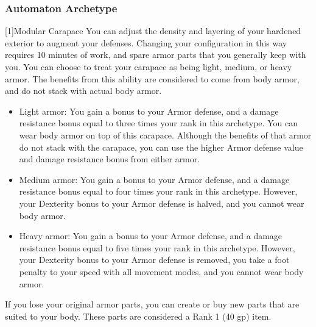         \subsubsection{Automaton Archetype}

            [1]{Modular Carapace} You can adjust the density and layering of your hardened exterior to augment your defenses.
            Changing your configuration in this way requires 10 minutes of work, and spare armor parts that you generally keep with you.
            You can choose to treat your carapace as being light, medium, or heavy armor.
            The benefits from this ability are considered to come from body armor, and do not stack with actual body armor.

            \begin{itemize}
                \item Light armor: You gain a  bonus to your Armor defense, and a damage resistance bonus equal to three times your rank in this archetype.
                    You can wear body armor on top of this carapace.
                    Although the benefits of that armor do not stack with the carapace, you can use the higher Armor defense value and damage resistance bonus from either armor.
                \item Medium armor: You gain a  bonus to your Armor defense, and a damage resistance bonus equal to four times your rank in this archetype.
                    However, your Dexterity bonus to your Armor defense is halved, and you cannot wear body armor.
                \item Heavy armor: You gain a  bonus to your Armor defense, and a damage resistance bonus equal to five times your rank in this archetype.
                    However, your Dexterity bonus to your Armor defense is removed, you take a  foot penalty to your speed with all movement modes, and you cannot wear body armor.
            \end{itemize}

            If you lose your original armor parts, you can create or buy new parts that are suited to your body.
            These parts are considered a Rank 1 (40 gp) item.

